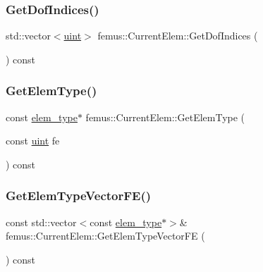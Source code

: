 \mbox{\label{classfemus_1_1_current_elem_a0a056fc0356898983b18a52464e77567}} 
\subsubsection{\texorpdfstring{Get\+Dof\+Indices()}{GetDofIndices()}}
{\footnotesize\ttfamily std\+::vector$<$\mbox{\hyperlink{_typedefs_8hpp_a91ad9478d81a7aaf2593e8d9c3d06a14}{uint}}$>$ femus\+::\+Current\+Elem\+::\+Get\+Dof\+Indices (\begin{DoxyParamCaption}{ }\end{DoxyParamCaption}) const\hspace{0.3cm}{\ttfamily [inline]}}

\mbox{\label{classfemus_1_1_current_elem_aad89677687498cb766cf47db822764af}} 
\subsubsection{\texorpdfstring{Get\+Elem\+Type()}{GetElemType()}}
{\footnotesize\ttfamily const \mbox{\hyperlink{classfemus_1_1elem__type}{elem\+\_\+type}}$\ast$ femus\+::\+Current\+Elem\+::\+Get\+Elem\+Type (\begin{DoxyParamCaption}\item[{const \mbox{\hyperlink{_typedefs_8hpp_a91ad9478d81a7aaf2593e8d9c3d06a14}{uint}}}]{fe }\end{DoxyParamCaption}) const\hspace{0.3cm}{\ttfamily [inline]}}

\mbox{\label{classfemus_1_1_current_elem_ad686bf1b06d7ff8ee4b4d53acbf39470}} 
\subsubsection{\texorpdfstring{Get\+Elem\+Type\+Vector\+F\+E()}{GetElemTypeVectorFE()}}
{\footnotesize\ttfamily const std\+::vector$<$const \mbox{\hyperlink{classfemus_1_1elem__type}{elem\+\_\+type}}$\ast$$>$\& femus\+::\+Current\+Elem\+::\+Get\+Elem\+Type\+Vector\+FE (\begin{DoxyParamCaption}{ }\end{DoxyParamCaption}) const\hspace{0.3cm}{\ttfamily [inline]}}

